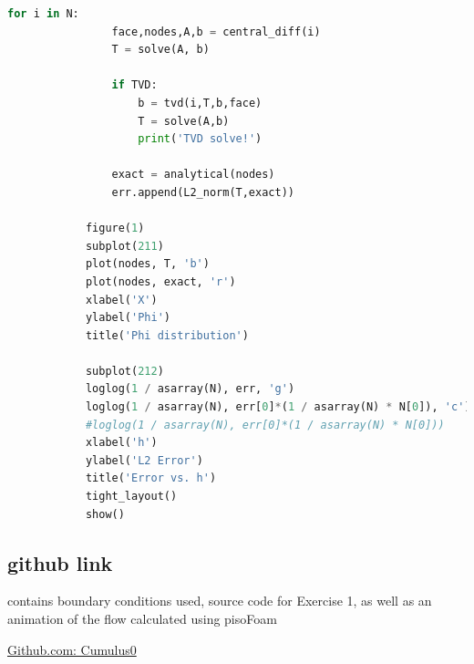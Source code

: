 \documentclass[paper=a4, fontsize=11pt]{article} %
\numberwithin{equation}{section} %
\numberwithin{figure}{section} %
\numberwithin{table}{section} %
\begin{document}
\begin{center}
\begin{lstlisting}[language=Python, captionpos = b, caption=Source code for excercise 1]
            for i in N:
                face,nodes,A,b = central_diff(i)
                T = solve(A, b)
        
                if TVD:
                    b = tvd(i,T,b,face)
                    T = solve(A,b)
                    print('TVD solve!')
        
                exact = analytical(nodes)
                err.append(L2_norm(T,exact))
                
            figure(1)
            subplot(211)
            plot(nodes, T, 'b')
            plot(nodes, exact, 'r')
            xlabel('X')
            ylabel('Phi')
            title('Phi distribution')
        
            subplot(212)
            loglog(1 / asarray(N), err, 'g')
            loglog(1 / asarray(N), err[0]*(1 / asarray(N) * N[0]), 'c')
            #loglog(1 / asarray(N), err[0]*(1 / asarray(N) * N[0]))
            xlabel('h')
            ylabel('L2 Error')
            title('Error vs. h')
            tight_layout()
            show()
        \end{lstlisting}
    
    \end{center}

    \subsection{github link}
    
    contains boundary conditions used, source code for Exercise 1, as well as an animation of the flow calculated using pisoFoam
    
    \begin{center}
        \href{https://github.com/Cumulus0/Masters/tree/master/MEK4470/oblig1}{Github.com: Cumulus0}   
    \end{center}

    
\end{document}
